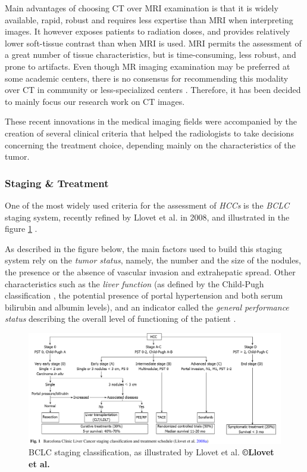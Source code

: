 \documentclass[]{article}
\begin{document}
Main advantages of choosing CT over MRI examination is that it is widely
available, rapid, robust and requires less expertise than MRI when
interpreting images. It however exposes patients to radiation doses, and
provides relatively lower soft-tissue contrast than when MRI is used.
MRI permits the assessment of a great number of tissue characteristics,
but is time-consuming, less robust, and prone to artifacts. Even though
MR imaging examination may be preferred at some academic centers, there
is no consensus for recommending this modality over CT in community or
less-specialized centers \cite{Choi2014a,Heimbach2018}.
Therefore, it has been decided to mainly focus our research work on CT
images.

These recent innovations in the medical imaging fields were accompanied
by the creation of several clinical criteria that helped the
radiologists to take decisions concerning the treatment choice,
depending mainly on the characteristics of the tumor.

\subsubsection*{Staging \& Treatment}\label{staging-treatment}

One of the most widely used criteria for the assessment of \emph{HCCs}
is the \emph{BCLC} staging system, recently refined by Llovet et al. in
2008, and illustrated in the figure \ref{BCLC_llovet} \cite{Llovet2008}.

As described in the figure below, the main factors used to build this
staging system rely on the \emph{tumor status}, namely, the number and
the size of the nodules, the presence or the absence of vascular
invasion and extrahepatic spread. Other characteristics such as the
\emph{liver function} (as defined by the Child-Pugh classification
\cite{Pugh1973} , the potential presence of portal
hypertension and both serum bilirubin and albumin levels), and an
indicator called the \emph{general performance status} describing the
overall level of functioning of the patient \cite{Oken1982}.

\begin{figure}[th!]
\centering
\includegraphics[width=0.7\linewidth]{images/image9}
\caption{BCLC staging classification, as illustrated by Llovet et al. \textbf{©Llovet et al.} \cite{Llovet2008}}
\label{BCLC_llovet}
\end{figure}
\end{document}
